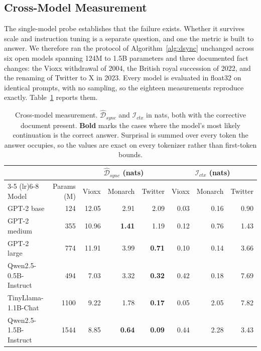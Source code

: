 \documentclass[manuscript, screen, review]{jair}
\begin{document}
\subsection{Cross-Model Measurement}
\label{sec:crossmodel}

The single-model probe establishes that the failure exists. Whether it survives
scale and instruction tuning is a separate question, and one the metric is built
to answer. We therefore ran the protocol of Algorithm~\ref{alg:dsync} unchanged
across six open models spanning 124M to 1.5B parameters and three documented
fact changes: the Vioxx withdrawal of 2004, the British royal succession of
2022, and the renaming of Twitter to X in 2023. Every model is evaluated in
float32 on identical prompts, with no sampling, so the eighteen measurements
reproduce exactly. Table~\ref{tab:crossmodel} reports them.

\begin{table}[t]
\centering
\caption{Cross-model measurement. $\widehat{\mathcal{D}}_{sync}$ and
$\mathcal{I}_{ctx}$ in nats, both with the corrective document present.
\textbf{Bold} marks the cases where the model's most likely continuation is the
correct answer. Surprisal is summed over every token the answer occupies, so the
values are exact on every tokenizer rather than first-token bounds.}
\label{tab:crossmodel}
\small
\begin{tabular}{lrrrrrrr}
\toprule
& & \multicolumn{3}{c}{$\widehat{\mathcal{D}}_{sync}$ (nats)}
& \multicolumn{3}{c}{$\mathcal{I}_{ctx}$ (nats)} \\
\cmidrule(lr){3-5} \cmidrule(lr){6-8}
Model & Params (M) & Vioxx & Monarch & Twitter & Vioxx & Monarch & Twitter \\
\midrule
GPT-2 base & 124 & 12.05 & 2.91 & 2.09 & 0.03 & 0.16 & 0.90 \\
GPT-2 medium & 355 & 10.96 & \textbf{1.41} & 1.19 & 0.12 & 0.76 & 1.43 \\
GPT-2 large & 774 & 11.91 & 3.99 & \textbf{0.71} & 0.10 & 0.14 & 3.66 \\
Qwen2.5-0.5B-Instruct & 494 & 7.03 & 3.32 & \textbf{0.32} & 0.42 & 0.18 & 7.69 \\
TinyLlama-1.1B-Chat & 1100 & 9.22 & 1.78 & \textbf{0.17} & 0.05 & 2.05 & 7.82 \\
Qwen2.5-1.5B-Instruct & 1544 & 8.85 & \textbf{0.64} & \textbf{0.09} & 0.44 & 2.28 & 3.43 \\
\bottomrule
\end{tabular}
\end{table}
\end{document}
